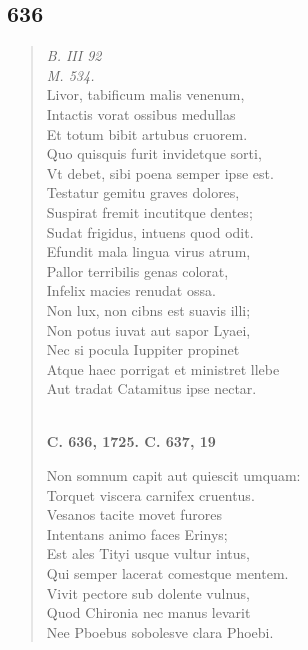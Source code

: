 \documentclass[11pt, a4paper]{report}
\begin{document}
            \subsection*{636}
      \begin{verse}
      \textit{B. III 92} \\ \textit{M. 534.} \\ Livor, tabificum malis venenum, \\ Intactis vorat ossibus medullas \\ Et totum bibit artubus cruorem. \\ Quo quisquis furit invidetque sorti, \\ Vt debet, sibi poena semper ipse est. \\ Testatur gemitu graves dolores, \\ Suspirat fremit incutitque dentes; \\ Sudat frigidus, intuens quod odit. \\ Efundit mala lingua virus atrum, \\ Pallor terribilis genas colorat, \\ Infelix macies renudat ossa. \\ Non lux, non cibns est suavis illi; \\ Non potus iuvat aut sapor Lyaei, \\ Nec si pocula Iuppiter propinet \\ Atque haec porrigat et ministret llebe \\ Aut tradat Catamitus ipse nectar. \\ 
        ﻿\pagebreak 
    \begin{center} \textbf{C. 636, 1725. C. 637, 19} \end{center} \marginpar{[103]} Non somnum capit aut quiescit umquam: \\ Torquet viscera carnifex cruentus. \\ Vesanos tacite movet furores \\ Intentans animo faces Erinys; \\ Est ales Tityi usque vultur intus, \\ Qui semper lacerat comestque mentem. \\ Vivit pectore sub dolente vulnus, \\ Quod Chironia nec manus levarit \\ Nee Pboebus sobolesve clara Phoebi. \\ 
      \end{verse}
  
\end{document}
